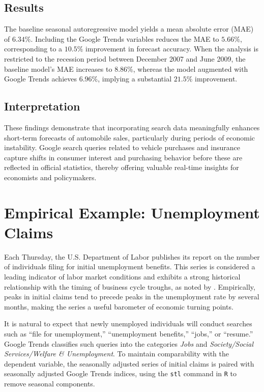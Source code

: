 \documentclass{article}
\begin{document}
\subsection{Results}
The baseline seasonal autoregressive model yields a mean absolute error (MAE) of $6.34\%$. 
Including the Google Trends variables reduces the MAE to $5.66\%$, corresponding to a $10.5\%$ improvement in forecast accuracy. 
When the analysis is restricted to the recession period between December 2007 and June 2009, the baseline model’s MAE increases to $8.86\%$, whereas the model augmented with Google Trends achieves $6.96\%$, implying a substantial $21.5\%$ improvement. 

\subsection{Interpretation}
These findings demonstrate that incorporating search data meaningfully enhances short-term forecasts of automobile sales, particularly during periods of economic instability. 
Google search queries related to vehicle purchases and insurance capture shifts in consumer interest and purchasing behavior before these are reflected in official statistics, thereby offering valuable real-time insights for economists and policymakers.


\section{Empirical Example: Unemployment Claims}

Each Thursday, the U.S. Department of Labor publishes its report on the number of individuals filing for initial unemployment benefits. 
This series is considered a leading indicator of labor market conditions and exhibits a strong historical relationship with the timing of business cycle troughs, as noted by \textcite{Gordon1982}. 
Empirically, peaks in initial claims tend to precede peaks in the unemployment rate by several months, making the series a useful barometer of economic turning points.

It is natural to expect that newly unemployed individuals will conduct searches such as ``file for unemployment,'' ``unemployment benefits,'' ``jobs,'' or ``resume.'' 
Google Trends classifies such queries into the categories \textit{Jobs} and \textit{Society/Social Services/Welfare \& Unemployment}. 
To maintain comparability with the dependent variable, the seasonally adjusted series of initial claims is paired with seasonally adjusted Google Trends indices, using the \texttt{stl} command in \texttt{R} to remove seasonal components.
\end{document}
